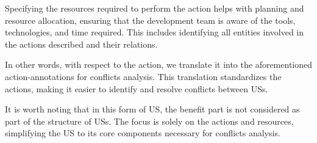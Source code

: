 \begin{definition}
\begin{itemize}
	Specifying the resources required to perform the action helps with planning and resource allocation, ensuring that the development team is aware of the tools, technologies, and time required. This includes identifying all entities involved in the actions described and their relations.
	
	In other words, with respect to the action, we translate it into the aforementioned action-annotations for conflicts analysis. This translation standardizes the actions, making it easier to identify and resolve conflicts between USs.
	
	It is worth noting that in this form of US, the benefit part is not considered as part of the structure of USs. The focus is solely on the actions and resources, simplifying the US to its core components necessary for conflicts analysis.

\end{itemize}
\end{definition}
